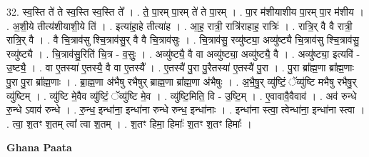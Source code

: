 \documentclass[17pt]{extarticle}
\begin{document}
32. स्व॒स्ति ते॑ ते स्व॒स्ति स्व॒स्ति ते᳚ । . ते॒ पा॒रम् पा॒रम् ते॑ ते पा॒रम् । . पा॒र म॑शीयाशीय पा॒रम् पा॒र म॑शीय । . अ॒शी॒ये तीत्य॑शीयाशी॒ये ति॑ । . इत्या॑हा॒हे तीत्या॑ह । . आ॒ह॒ रात्री॒ रात्रि॑राहाह॒ रात्रिः॑ । . रात्रि॒र् वै वै रात्री॒ रात्रि॒र् वै । . वै चि॒त्राव॑सु श्चि॒त्राव॑सु॒र् वै वै चि॒त्राव॑सुः । . चि॒त्राव॑सु॒ रव्यु॑ष्ट्या॒ अव्यु॑ष्ट्यै चि॒त्राव॑सु श्चि॒त्राव॑सु॒ रव्यु॑ष्ट्यै । . चि॒त्राव॑सु॒रिति॑ चि॒त्र - व॒सुः॒ । . अव्यु॑ष्ट्यै॒ वै वा अव्यु॑ष्ट्या॒ अव्यु॑ष्ट्यै॒ वै । . अव्यु॑ष्ट्या॒ इत्यवि॑ - उ॒ष्ट्यै॒ । . वा ए॒तस्या॑ ए॒तस्यै॒ वै वा ए॒तस्यै᳚ । . ए॒तस्यै॑ पु॒रा पु॒रैतस्या॑ ए॒तस्यै॑ पु॒रा । . पु॒रा ब्रा᳚ह्म॒णा ब्रा᳚ह्म॒णाः पु॒रा पु॒रा ब्रा᳚ह्म॒णाः । . ब्रा॒ह्म॒णा अ॑भैषु रभैषुर् ब्राह्म॒णा ब्रा᳚ह्म॒णा अ॑भैषुः । . अ॒भै॒षु॒र् व्यु॑ष्टिं॒ ॅव्यु॑ष्टि मभैषु रभैषु॒र् व्यु॑ष्टिम् । . व्यु॑ष्टि मे॒वैव व्यु॑ष्टिं॒ ॅव्यु॑ष्टि मे॒व । . व्यु॑ष्टि॒मिति॒ वि - उ॒ष्टि॒म् । . ए॒वावावै॒वैवाव॑ । . अव॑ रुन्धे रु॒न्धे ऽवाव॑ रुन्धे । . रु॒न्ध॒ इन्धा॑ना॒ इन्धा॑ना रुन्धे रुन्ध॒ इन्धा॑नाः । . इन्धा॑ना स्त्वा॒ त्वेन्धा॑ना॒ इन्धा॑ना स्त्वा । . त्वा॒ श॒तꣳ श॒तम् त्वा᳚ त्वा श॒तम् । . श॒तꣳ हिमा॒ हिमाः᳚ श॒तꣳ श॒तꣳ हिमाः᳚ । \newline

\textbf{Ghana Paata } \newline
\end{document}
